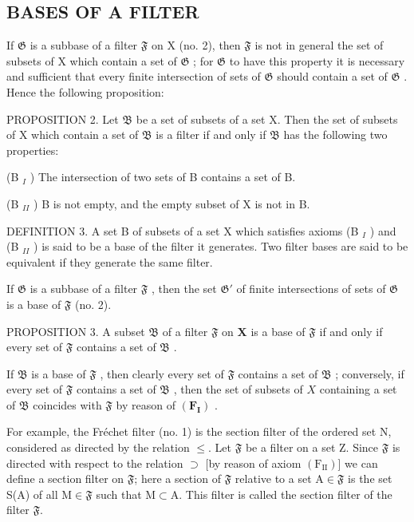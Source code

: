 \subsection{BASES OF A FILTER}

If \(\mathfrak{G}\) is a subbase of a filter \(\mathfrak{F}\) on X (no. 2), then \(\mathfrak{F}\) is not in general the set of subsets of X which contain a set of \(\mathfrak{G}\) ; for \(\mathfrak{G}\) to have this property it is necessary and sufficient that every finite intersection of sets of \(\mathfrak{G}\) should contain a set of \(\mathfrak{G}\) . Hence the following proposition:

PROPOSITION 2. Let \(\mathfrak{B}\) be a set of subsets of a set X. Then the set of subsets of X which contain a set of \(\mathfrak{B}\) is a filter if and only if \(\mathfrak{B}\) has the following two properties:

(B \(_{I}\) ) The intersection of two sets of B contains a set of B.

(B \(_{II}\) ) B is not empty, and the empty subset of X is not in B.

DEFINITION 3. A set B of subsets of a set X which satisfies axioms (B \(_{I}\) ) and (B \(_{II}\) ) is said to be a base of the filter it generates. Two filter bases are said to be equivalent if they generate the same filter.

If \(\mathfrak{G}\) is a subbase of a filter \(\mathfrak{F}\) , then the set \(\mathfrak{G}'\) of finite intersections of sets of \(\mathfrak{G}\) is a base of \(\mathfrak{F}\) (no. 2).

PROPOSITION 3. A subset \(\mathfrak{B}\) of a filter \(\mathfrak{F}\) on \(\mathbf{X}\) is a base of \(\mathfrak{F}\) if and only if every set of \(\mathfrak{F}\) contains a set of \(\mathfrak{B}\) .

If \(\mathfrak{B}\) is a base of \(\mathfrak{F}\) , then clearly every set of \(\mathfrak{F}\) contains a set of \(\mathfrak{B}\) ; conversely, if every set of \(\mathfrak{F}\) contains a set of \(\mathfrak{B}\) , then the set of subsets of \(X\) containing a set of \(\mathfrak{B}\) coincides with \(\mathfrak{F}\) by reason of \((\mathbf{F}_{\mathbf{I}})\) .

For example, the Fréchet filter (no. 1) is the section filter of the ordered set N, considered as directed by the relation \(\leqslant\). Let \(\mathfrak{F}\) be a filter on a set Z. Since \(\mathfrak{F}\) is directed with respect to the relation \(\supset\) {[}by reason of axiom \((\mathrm{F}_{\mathrm{II}})\){]} we can define a section filter on \(\mathfrak{F}\); here a section of \(\mathfrak{F}\) relative to a set A\(\in\mathfrak{F}\) is the set S(A) of all M\(\in\mathfrak{F}\) such that M\(\subset\)A. This filter is called the section filter of the filter \(\mathfrak{F}\).

